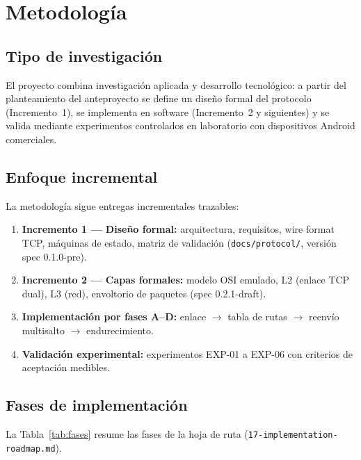 \chapter{Metodología}
\label{cap:metodologia}

\section{Tipo de investigación}
\label{sec:tipo-investigacion}

El proyecto combina investigación aplicada y desarrollo tecnológico: a partir del planteamiento del anteproyecto se define un diseño formal del protocolo (Incremento~1), se implementa en software (Incremento~2 y siguientes) y se valida mediante experimentos controlados en laboratorio con dispositivos Android comerciales.

\section{Enfoque incremental}
\label{sec:enfoque-incremental}

La metodología sigue entregas incrementales trazables:

\begin{enumerate}[label=\textbf{I\arabic*.}]
  \item \textbf{Incremento 1 --- Diseño formal:} arquitectura, requisitos, wire format TCP, máquinas de estado, matriz de validación (\texttt{docs/protocol/}, versión spec 0.1.0-pre).
  \item \textbf{Incremento 2 --- Capas formales:} modelo OSI emulado, L2 (enlace TCP dual), L3 (red), envoltorio de paquetes (spec 0.2.1-draft).
  \item \textbf{Implementación por fases A--D:} enlace $\rightarrow$ tabla de rutas $\rightarrow$ reenvío multisalto $\rightarrow$ endurecimiento.
  \item \textbf{Validación experimental:} experimentos EXP-01 a EXP-06 con criterios de aceptación medibles.
\end{enumerate}

\section{Fases de implementación}
\label{sec:fases-implementacion}

La Tabla~\ref{tab:fases} resume las fases de la hoja de ruta (\texttt{17-implementation-roadmap.md}).

